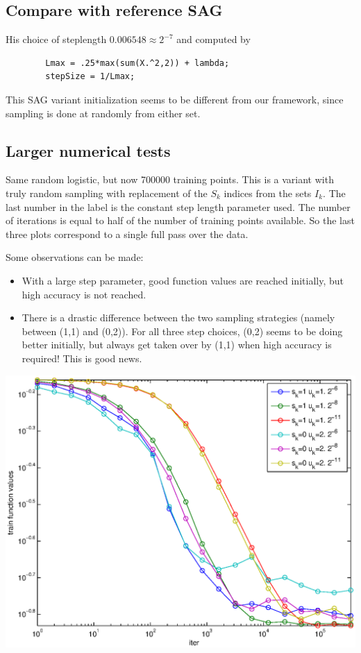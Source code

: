 \documentclass[12pt]{article}
\begin{document}
	\subsection{Compare with reference SAG}
	His choice of steplength $0.006548 \approx 2^{-7}$ and computed by 
	\begin{verbatim}
		Lmax = .25*max(sum(X.^2,2)) + lambda;
		stepSize = 1/Lmax;
		\end{verbatim} 
		
		This SAG variant initialization seems to be different from our framework, since sampling is done at randomly from either set. 
	
	
	\subsection{Larger numerical tests}
	Same random logistic, but now 700000 training points. This is a variant with truly random sampling with replacement of the $S_k$ indices from the sets $I_k$. The last number in the label is the constant step length parameter used. The number of iterations is equal to half of the number of training points available. So the last three plots correspond to a single full pass over the data. 
	
	Some observations can be made: 
	\begin{itemize}
		\item With a large step parameter, good function values are reached initially, but high accuracy is not reached. \\
		\item There is a drastic difference between the two sampling strategies (namely between (1,1) and (0,2)). For all three step choices, (0,2) seems to be doing better initially, but always get taken over by (1,1) when high accuracy is required! This is good news. 
	\end{itemize}

	\begin{center}
	\includegraphics{Figures/12-4.eps}    
	\end{center}
\end{document}
